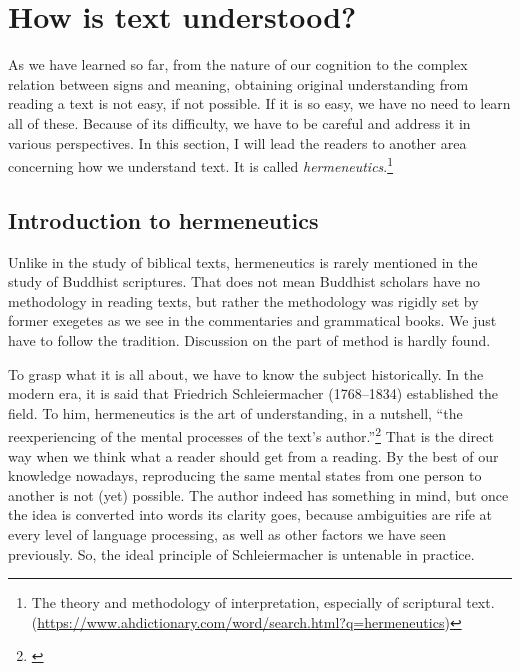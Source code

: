 \chapter{How is text understood?}\label{chap:howtextunder}

As we have learned so far, from the nature of our cognition to the complex relation between signs and meaning, obtaining original understanding from reading a text is not easy, if not possible. If it is so easy, we have no need to learn all of these. Because of its difficulty, we have to be careful and address it in various perspectives. In this section, I will lead the readers to another area concerning how we understand text. It is called \emph{hermeneutics}.\footnote{The theory and methodology of interpretation, especially of scriptural text. (\url{https://www.ahdictionary.com/word/search.html?q=hermeneutics})}

{}
\section*{Introduction to hermeneutics}

Unlike in the study of biblical texts, hermeneutics is rarely mentioned in the study of Buddhist scriptures. That does not mean Buddhist scholars have no methodology in reading texts, but rather the methodology was rigidly set by former exegetes as we see in the commentaries and grammatical books. We just have to follow the tradition. Discussion on the part of method is hardly found.

To grasp what it is all about, we have to know the subject historically. In the modern era, it is said that Friedrich Schleiermacher (1768--1834) established the field. To him, hermeneutics is the art of understanding, in a nutshell, ``the reexperiencing of the mental processes of the text's author.''\footnote{\citealp[p.~86]{palmer:hermeneutics}} That is the direct way when we think what a reader should get from a reading. By the best of our knowledge nowadays, reproducing the same mental states from one person to another is not (yet) possible. The author indeed has something in mind, but once the idea is converted into words its clarity goes, because ambiguities are rife at every level of language processing, as well as other factors we have seen previously. So, the ideal principle of Schleiermacher is untenable in practice.

